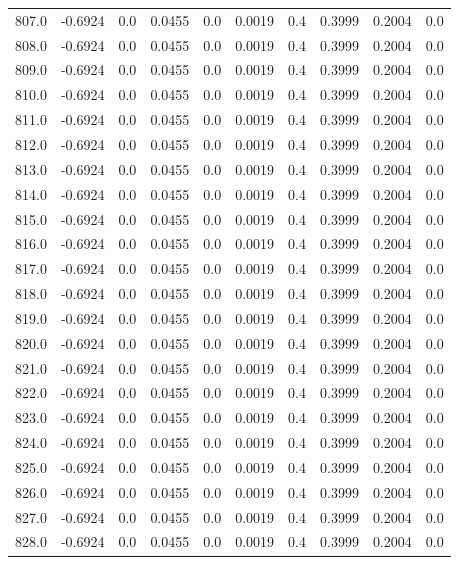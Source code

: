\begin{longtable}{lrrrrrrrrr}
807.0 & -0.6924 & 0.0 & 0.0455 & 0.0 & 0.0019 & 0.4 & 0.3999 & 0.2004 & 0.0 \\
808.0 & -0.6924 & 0.0 & 0.0455 & 0.0 & 0.0019 & 0.4 & 0.3999 & 0.2004 & 0.0 \\
809.0 & -0.6924 & 0.0 & 0.0455 & 0.0 & 0.0019 & 0.4 & 0.3999 & 0.2004 & 0.0 \\
810.0 & -0.6924 & 0.0 & 0.0455 & 0.0 & 0.0019 & 0.4 & 0.3999 & 0.2004 & 0.0 \\
811.0 & -0.6924 & 0.0 & 0.0455 & 0.0 & 0.0019 & 0.4 & 0.3999 & 0.2004 & 0.0 \\
812.0 & -0.6924 & 0.0 & 0.0455 & 0.0 & 0.0019 & 0.4 & 0.3999 & 0.2004 & 0.0 \\
813.0 & -0.6924 & 0.0 & 0.0455 & 0.0 & 0.0019 & 0.4 & 0.3999 & 0.2004 & 0.0 \\
814.0 & -0.6924 & 0.0 & 0.0455 & 0.0 & 0.0019 & 0.4 & 0.3999 & 0.2004 & 0.0 \\
815.0 & -0.6924 & 0.0 & 0.0455 & 0.0 & 0.0019 & 0.4 & 0.3999 & 0.2004 & 0.0 \\
816.0 & -0.6924 & 0.0 & 0.0455 & 0.0 & 0.0019 & 0.4 & 0.3999 & 0.2004 & 0.0 \\
817.0 & -0.6924 & 0.0 & 0.0455 & 0.0 & 0.0019 & 0.4 & 0.3999 & 0.2004 & 0.0 \\
818.0 & -0.6924 & 0.0 & 0.0455 & 0.0 & 0.0019 & 0.4 & 0.3999 & 0.2004 & 0.0 \\
819.0 & -0.6924 & 0.0 & 0.0455 & 0.0 & 0.0019 & 0.4 & 0.3999 & 0.2004 & 0.0 \\
820.0 & -0.6924 & 0.0 & 0.0455 & 0.0 & 0.0019 & 0.4 & 0.3999 & 0.2004 & 0.0 \\
821.0 & -0.6924 & 0.0 & 0.0455 & 0.0 & 0.0019 & 0.4 & 0.3999 & 0.2004 & 0.0 \\
822.0 & -0.6924 & 0.0 & 0.0455 & 0.0 & 0.0019 & 0.4 & 0.3999 & 0.2004 & 0.0 \\
823.0 & -0.6924 & 0.0 & 0.0455 & 0.0 & 0.0019 & 0.4 & 0.3999 & 0.2004 & 0.0 \\
824.0 & -0.6924 & 0.0 & 0.0455 & 0.0 & 0.0019 & 0.4 & 0.3999 & 0.2004 & 0.0 \\
825.0 & -0.6924 & 0.0 & 0.0455 & 0.0 & 0.0019 & 0.4 & 0.3999 & 0.2004 & 0.0 \\
826.0 & -0.6924 & 0.0 & 0.0455 & 0.0 & 0.0019 & 0.4 & 0.3999 & 0.2004 & 0.0 \\
827.0 & -0.6924 & 0.0 & 0.0455 & 0.0 & 0.0019 & 0.4 & 0.3999 & 0.2004 & 0.0 \\
828.0 & -0.6924 & 0.0 & 0.0455 & 0.0 & 0.0019 & 0.4 & 0.3999 & 0.2004 & 0.0 \\

\end{longtable}
